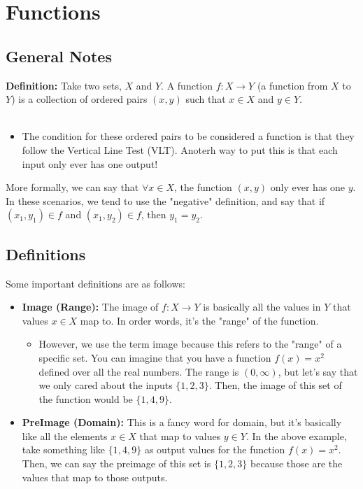 \section{Functions}
\subsection{General Notes}

\textbf{Definition:} Take two sets, $X$ and $Y$. A function $f: X \to Y$ (a function from $X$ to $Y$) is a collection of ordered pairs $(x,y)$ such that $x \in X$ and $y \in Y$. \\
\\
\begin{itemize}
  \item The condition for these ordered pairs to be considered a function is that they follow the Vertical Line Test (VLT). Anoterh way to put this is that each input only ever has one output!
\end{itemize}
More formally, we can say that $\forall x \in X$, the function $(x,y)$ only ever has one $y$. In these scenarios, we tend to use the "negative" definition, and say that if $(x_1, y_1) \in f$ and $(x_1, y_2) \in f$, then $y_1 = y_2$. 

\subsection{Definitions}

Some important definitions are as follows:

\begin{itemize}
\item \textbf{Image (Range):} The image of $f: X \rightarrow Y$ is basically all the values in $Y$ that values $x \in X$ map to. In order words, it's the "range" of the function. 
  \begin{itemize}
    \item However, we use the term image because this refers to the "range" of a specific set. You can imagine that you have a function $f(x) = x^2$ defined over all the real numbers. The range is $(0, \infty)$, but let's say that we only cared about the inputs $\{1,2,3\}$. Then, the image of this set of the function would be $\{1,4,9\}$. 
  \end{itemize}
\item \textbf{PreImage (Domain):} This is a fancy word for domain, but it's basically like all the elements $x \in X$ that map to values $y \in Y$. In the above example, take something like $\{1,4,9\}$ as output values for the function $f(x) = x^2$. Then, we can say the preimage of this set is $\{1,2,3\}$ because those are the values that map to those outputs.
\end{itemize}

